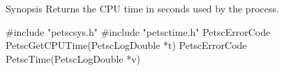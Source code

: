 Synopsis
Returns the CPU time in seconds used by the process.

#include "petscsys.h" 
#include "petsctime.h" 
PetscErrorCode PetscGetCPUTime(PetscLogDouble *t)
PetscErrorCode PetscTime(PetscLogDouble *v)
